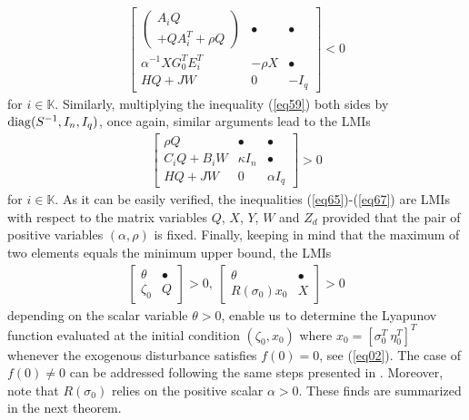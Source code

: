 \documentclass[twocolumn]{autarc_LH}
\newcommand{\Kn}{{\mathbb K}}
\begin{document}
\begin{align}
\label{eq66} \left [ \begin{array}{ccc} \left ( \begin{array}{c} A_{i} Q  \\ + Q A_{i}^T  + \rho Q  \end{array} \right )  & \bullet & \bullet \\ \alpha^{-1} X G_0^TE_{i}^T & - \rho X & \bullet \\ HQ + JW & 0 & - I_q \end{array} \!\! \right ] <0
\end{align}
for $i \in \Kn$. Similarly, multiplying the inequality (\ref{eq59}) both sides by ${\rm diag}(S^{-1}, I_n, I_q)$, once again, similar arguments lead to the LMIs 
\begin{align}
\label{eq67} \left [ \begin{array}{ccc} \rho Q   & \bullet & \bullet \\ C_{i}Q + B_{i}W & \kappa I_n & \bullet \\ HQ + JW  & 0 &  \alpha I_q \end{array} \!\! \right ] > 0 
\end{align}
for $i \in \Kn$. As it can be easily verified, the inequalities (\ref{eq65})-(\ref{eq67}) are LMIs with respect to the matrix variables $Q$, $X$, $Y$, $W$ and $Z_d$ provided that the pair of positive variables $(\alpha, \rho)$ is fixed. Finally, keeping in mind that the maximum of two elements equals the minimum upper bound, the LMIs
\begin{align}
		\label{eq68}  \left [ \begin{array}{cc} \theta & \bullet \\ \zeta_0 & Q \end{array} \right ]>0,~\left [ \begin{array}{cc} \theta & \bullet \\ R(\sigma_0) x_0 & X \end{array} \right ]>0
\end{align}
depending on the scalar variable $\theta>0$, enable us to determine the Lyapunov function evaluated at the initial condition $(\zeta_0, x_0)$ where $x_0 = [\sigma_0^T~ \eta_0^T]^T$ whenever the exogenous disturbance satisfies $f(0)=0$, see (\ref{eq02}). The case of $ f(0) \neq 0$ can be addressed following the same steps presented in \cite{NGH:2024}. Moreover, note that $R(\sigma_0)$ relies on the positive scalar $\alpha >0$. These finds are summarized in the next theorem. 
\end{document}
